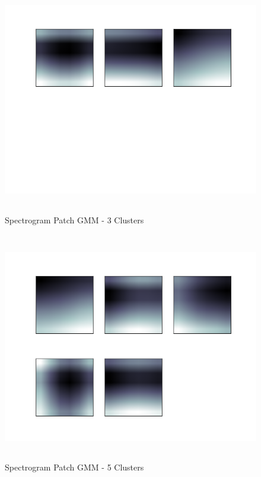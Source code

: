 \documentclass[11pt]{article}
\begin{document}
\begin{figure}[htb]
\centering
\includegraphics[height=10cm]{./spec_patch_clustersGMM3.png}
\caption{\label{fig:spec_patch_clustersGMM3}Spectrogram Patch GMM - 3 Clusters}
\end{figure}


\begin{figure}[htb]
\centering
\includegraphics[height=10cm]{./spec_patch_clustersGMM5.png}
\caption{\label{fig:spec_patch_clustersGMM5}Spectrogram Patch GMM - 5 Clusters}
\end{figure}
\end{document}
